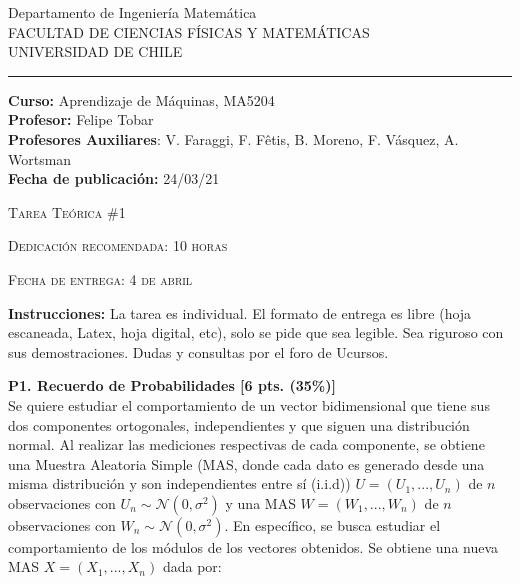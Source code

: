 \documentclass[letterpaper,11pt]{article}
\theoremstyle{plain}
\theoremstyle{definition}
\newcommand{\1}{\mathbbm{1}}
\begin{document}
\begin{minipage}{4cm}
\thispagestyle{empty}
\end{minipage}


\begin{minipage}{15cm}
\textsf{\small Departamento de Ingenier\'ia Matem\'atica}\\
\textsf{\tiny FACULTAD  DE  CIENCIAS F\'ISICAS Y MATEM\'ATICAS}\\
\textsf{\tiny UNIVERSIDAD  DE  CHILE}
\par\noindent\rule{\textwidth}{0.4pt}
\textsf{\footnotesize {\textbf{Curso:} Aprendizaje de Máquinas, MA5204}}\\
\textsf{\footnotesize {\textbf{Profesor:} Felipe Tobar}}\\
\textsf{\footnotesize {\textbf{Profesores Auxiliares}: V. Faraggi, F. Fêtis, B. Moreno, F. Vásquez, A. Wortsman}}\\
\textsf{\footnotesize {\textbf{Fecha de publicación:} 24/03/21}}\\
\end{minipage}
\begin{center}\textsc{Tarea Teórica \#1}\end{center}
\begin{center}\textsc{Dedicación recomendada: 10 horas}\end{center}
\begin{center}\textsc{Fecha de entrega: 4 de abril}\end{center}
\begin{flushleft}
\textbf{Instrucciones:} La tarea es individual. El formato de entrega es libre (hoja escaneada, Latex, hoja digital, etc), solo se pide que sea legible. Sea riguroso con sus demostraciones. Dudas y consultas por el foro de Ucursos. 
\end{flushleft}


\thispagestyle{empty}

\textbf{P1. Recuerdo de Probabilidades [6 pts. (35\%)]}\\

Se quiere estudiar el comportamiento de un vector bidimensional que tiene sus dos componentes ortogonales, independientes y que siguen una distribución normal. Al realizar las mediciones respectivas de cada componente, se obtiene una Muestra Aleatoria Simple (MAS, donde cada dato es generado desde una misma distribución y son independientes entre sí (i.i.d)) $U=(U_1,...,U_n)$ de $n$ observaciones con $U_n\sim\mathcal{N}(0,\sigma^2)$  y una MAS $W=(W_1,...,W_n)$  de $n$ observaciones con $W_n\sim\mathcal{N}(0,\sigma^2)$. En específico, se busca estudiar el comportamiento de los módulos de los vectores obtenidos. Se obtiene una nueva MAS $X=(X_1,...,X_n)$ dada por:
\end{document}
